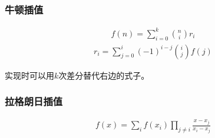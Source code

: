 \subsubsection{牛顿插值}

$$ \begin{aligned} f(n)=\sum_{i=0}^{k}{n\choose i}r_i \end{aligned} $$
$$ \begin{aligned} r_i=\sum_{j=0}^i(-1)^{i-j}{i\choose j}f(j) \end{aligned} $$

实现时可以用$k$次差分替代右边的式子。

\subsubsection{拉格朗日插值}

$$\begin{aligned}f(x) = \sum_i f(x_i)\prod_{j\ne i}\frac{x-x_j}{x_i-x_j}\end{aligned}$$